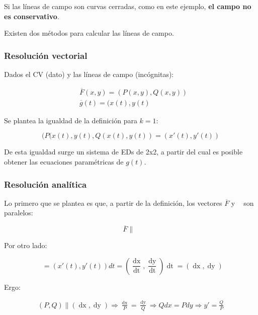 \documentclass{article}
\begin{document}
Si las líneas de campo son curvas cerradas, como en este ejemplo, \textbf{el campo no es conservativo}.

Existen dos métodos para calcular las líneas de campo.

\subsubsection{Resolución vectorial}

Dados el CV (dato) y las líneas de campo (incógnitas):

\begin{align}
& \overline{F}(x,y) = (P(x,y), Q(x,y)) \\
& \overline{g}(t) = (x(t), y(t)
\end{align}

Se plantea la igualdad de la definición para $k = 1$:

\begin{equation}
(P(x(t), y(t), Q(x(t), y(t)) = (x'(t), y'(t))
\end{equation}

De esta igualdad surge un sistema de EDs de 2x2, a partir del cual es posible obtener las ecuaciones paramétricas de $g(t)$.

\subsubsection{Resolución analítica}

Lo primero que se plantea es que, a partir de la definición, los vectores $\overline{F}$ y $\mathop{\overline{dg}}$ son paralelos:

\begin{equation}
\overline{F} \parallel \mathop{\overline{dg}}
\end{equation}

Por otro lado:

\begin{equation}
\mathop{\overline{dg}} = (x'(t), y'(t)) dt = \left( \frac{\mathop{dx}}{\mathop{dt}}, \frac{\mathop{dy}}{\mathop{dt}} \right) \mathop{dt} = (\mathop{dx}, \mathop{dy})
\end{equation}

Ergo:

\begin{align}
(P, Q) \parallel (\mathop{dx}, \mathop{dy}) \Rightarrow \frac{\mathop{dx}}{P} = \frac{\mathop{dy}}{Q} \Rightarrow Q dx = P dy \Rightarrow y' = \frac{Q}{P}
\end{align}
\end{document}
